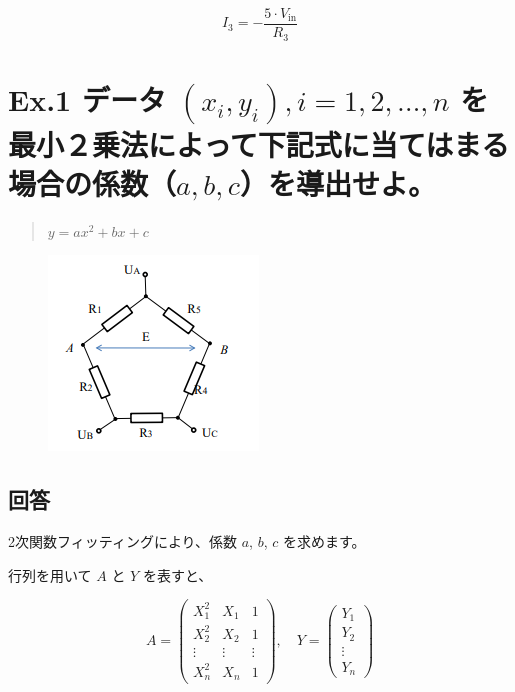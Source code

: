 \documentclass{article}
\begin{document}
\[
I_3 = -\frac{5 \cdot V_{\text{in}}}{R_3}
\]

\newpage  %

\section*{Ex.1 データ \((x_i, y_i), i=1,2,\dots,n\) を最小２乗法によって下記式に当てはまる場合の係数（\(a, b, c\)）を導出せよ。}
\begin{quote}
\( y = ax^2 + bx + c \)
\end{quote}

\begin{figure}[H]
    \centering
    \includegraphics[width=0.7\linewidth]{e1.png}
\end{figure}

\subsection*{回答}
2次関数フィッティングにより、係数 \(a\), \(b\), \(c\) を求めます。

行列を用いて \(A\) と \(Y\) を表すと、

\[
A = \begin{pmatrix} X_1^2 & X_1 & 1 \\ X_2^2 & X_2 & 1 \\ \vdots & \vdots & \vdots \\ X_n^2 & X_n & 1 \end{pmatrix}, \quad Y = \begin{pmatrix} Y_1 \\ Y_2 \\ \vdots \\ Y_n \end{pmatrix}
\]
\end{document}
